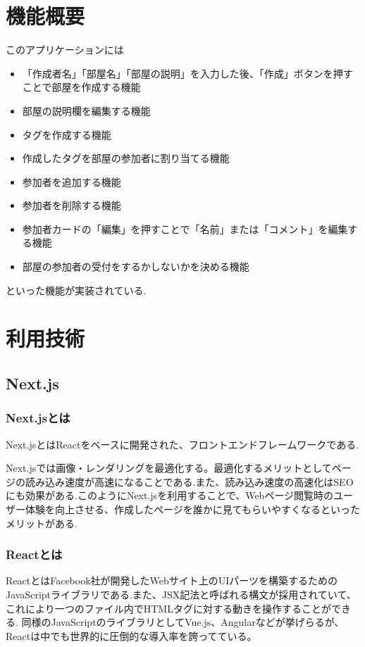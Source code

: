 \documentclass[submit,techrep]{ipsj}
\begin{document}
\section{機能概要}
このアプリケーションには
\begin{itemize}
  \item 「作成者名」「部屋名」「部屋の説明」を入力した後、「作成」ボタンを押すことで部屋を作成する機能
  \item 部屋の説明欄を編集する機能
  \item  タグを作成する機能
  \item 作成したタグを部屋の参加者に割り当てる機能
  \item 参加者を追加する機能
  \item 参加者を削除する機能
  \item 参加者カードの「編集」を押すことで「名前」または「コメント」を編集する機能
  \item 部屋の参加者の受付をするかしないかを決める機能
  \end{itemize}
  といった機能が実装されている.

\section{利用技術}
\subsection{Next.js}
\subsubsection{Next.jsとは}
Next.jsとはReactをベースに開発された、フロントエンドフレームワークである.

Next.jsでは画像・レンダリングを最適化する。最適化するメリットとしてページの読み込み速度が高速になることである.また、読み込み速度の高速化はSEOにも効果がある.このようにNext.jsを利用することで、Webページ閲覧時のユーザー体験を向上させる、作成したページを誰かに見てもらいやすくなるといったメリットがある.

\subsubsection{Reactとは}
ReactとはFacebook社が開発したWebサイト上のUIパーツを構築するためのJavaScriptライブラリである.また、JSX記法と呼ばれる構文が採用されていて、これにより一つのファイル内でHTMLタグに対する動きを操作することができる.
同様のJavaScriptのライブラリとしてVue.js、Angularなどが挙げらるが、Reactは中でも世界的に圧倒的な導入率を誇ってている。
\end{document}
